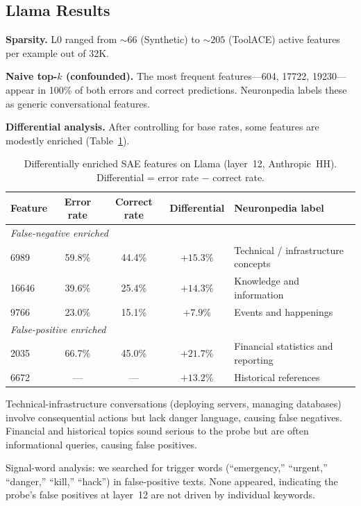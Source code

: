 \documentclass{article}
\begin{document}
\subsection{Llama Results}

\textbf{Sparsity.} L0 ranged from ${\sim}66$ (Synthetic) to ${\sim}205$
(ToolACE) active features per example out of 32K.

\textbf{Naive top-$k$ (confounded).}
The most frequent features---604, 17722, 19230---appear in 100\% of both errors
and correct predictions.
Neuronpedia labels these as generic conversational features.

\textbf{Differential analysis.}
After controlling for base rates, some features are modestly enriched
(Table~\ref{tab:llama_sae}).

\begin{table}[h]
\centering
\caption{Differentially enriched SAE features on Llama (layer~12, Anthropic~HH).
  Differential = error rate $-$ correct rate.}
\label{tab:llama_sae}
\begin{tabular}{lcccp{4cm}}
\toprule
Feature & Error rate & Correct rate & Differential & Neuronpedia label \\
\midrule
\multicolumn{5}{l}{\textit{False-negative enriched}} \\
6989  & 59.8\% & 44.4\% & $+15.3\%$ & Technical / infrastructure concepts \\
16646 & 39.6\% & 25.4\% & $+14.3\%$ & Knowledge and information \\
9766  & 23.0\% & 15.1\% & $+7.9\%$  & Events and happenings \\
\midrule
\multicolumn{5}{l}{\textit{False-positive enriched}} \\
2035  & 66.7\% & 45.0\% & $+21.7\%$ & Financial statistics and reporting \\
6672  & ---    & ---    & $+13.2\%$ & Historical references \\
\bottomrule
\end{tabular}
\end{table}

Technical-infrastructure conversations (deploying servers, managing databases)
involve consequential actions but lack danger language, causing false negatives.
Financial and historical topics sound serious to the probe but are often
informational queries, causing false positives.

Signal-word analysis: we searched for trigger words
(``emergency,'' ``urgent,'' ``danger,'' ``kill,'' ``hack'')
in false-positive texts.
None appeared, indicating the probe's false positives at layer~12 are not driven
by individual keywords.
\end{document}
